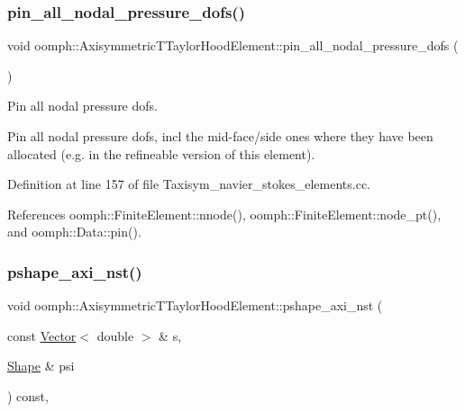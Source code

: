\subsubsection{\texorpdfstring{pin\+\_\+all\+\_\+nodal\+\_\+pressure\+\_\+dofs()}{pin\_all\_nodal\_pressure\_dofs()}}
{\footnotesize\ttfamily void oomph\+::\+Axisymmetric\+T\+Taylor\+Hood\+Element\+::pin\+\_\+all\+\_\+nodal\+\_\+pressure\+\_\+dofs (\begin{DoxyParamCaption}{ }\end{DoxyParamCaption})\hspace{0.3cm}{\ttfamily [protected]}}



Pin all nodal pressure dofs. 

Pin all nodal pressure dofs, incl the mid-\/face/side ones where they have been allocated (e.\+g. in the refineable version of this element). 

Definition at line 157 of file Taxisym\+\_\+navier\+\_\+stokes\+\_\+elements.\+cc.



References oomph\+::\+Finite\+Element\+::nnode(), oomph\+::\+Finite\+Element\+::node\+\_\+pt(), and oomph\+::\+Data\+::pin().

\mbox{\label{classoomph_1_1AxisymmetricTTaylorHoodElement_a9a52e3c13681e0ad373b330a0934b7a1}} 
\subsubsection{\texorpdfstring{pshape\+\_\+axi\+\_\+nst()}{pshape\_axi\_nst()}\hspace{0.1cm}{\footnotesize\ttfamily [1/2]}}
{\footnotesize\ttfamily void oomph\+::\+Axisymmetric\+T\+Taylor\+Hood\+Element\+::pshape\+\_\+axi\+\_\+nst (\begin{DoxyParamCaption}\item[{const \hyperlink{classoomph_1_1Vector}{Vector}$<$ double $>$ \&}]{s,  }\item[{\hyperlink{classoomph_1_1Shape}{Shape} \&}]{psi }\end{DoxyParamCaption}) const\hspace{0.3cm}{\ttfamily [inline]}, {\ttfamily [virtual]}}




